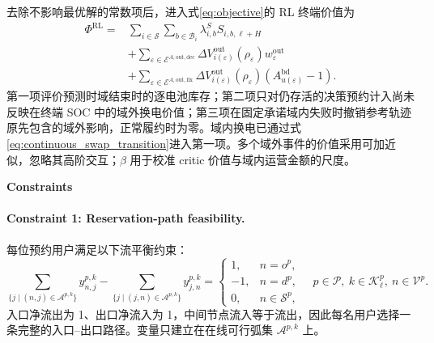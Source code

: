 \documentclass[12pt,a4paper,UTF8]{ctexart}
\begin{document}
去除不影响最优解的常数项后，进入式\eqref{eq:objective}的 RL 终端价值为
\begin{equation}
\begin{aligned}
\Phi^{\mathrm{RL}}
={}&
\sum_{i\in\mathcal S}\sum_{b\in\mathcal B_i}
\lambda^S_{i,b}S_{i,b,\ell+H}\\
&+\sum_{\varepsilon\in\mathcal E^{A,\mathrm{out},\mathrm{dec}}}
\Delta V_{i(\varepsilon)}^{\mathrm{out}}(\rho_\varepsilon)
w_\varepsilon^{\mathrm{out}}\\
&+\sum_{\varepsilon\in\mathcal E^{A,\mathrm{out},\mathrm{fix}}}
\Delta V_{i(\varepsilon)}^{\mathrm{out}}(\rho_\varepsilon)
\left(A_{u(\varepsilon)}^{\mathrm{bd}}-1\right).
\end{aligned}
\label{eq:rl_terminal_value}
\end{equation}
第一项评价预测时域结束时的逐电池库存；第二项只对仍存活的决策预约计入尚未反映在终端 SOC 中的域外换电价值；第三项在固定承诺域内失败时撤销参考轨迹原先包含的域外影响，正常履约时为零。域内换电已通过式\eqref{eq:continuous_swap_transition}进入第一项。多个域外事件的价值采用可加近似，忽略其高阶交互；$\beta$ 用于校准 critic 价值与域内运营金额的尺度。

\textbf{Constraints}

\paragraph{Constraint 1: Reservation-path feasibility.}
每位预约用户满足以下流平衡约束：
\begin{equation}
\sum_{\{j\mid(n,j)\in\mathcal A^{p,k}\}}
y_{n,j}^{p,k}
-
\sum_{\{j\mid(j,n)\in\mathcal A^{p,k}\}}
y_{j,n}^{p,k}
=
\begin{cases}
1,&n=o^p,\\
-1,&n=d^p,\\
0,&n\in\mathcal S^p,
\end{cases}
\quad
p\in\mathcal P,\ k\in\mathcal K_\ell^p,\ n\in\mathcal V^p.
\label{eq:flow}
\end{equation}
入口净流出为 1、出口净流入为 1，中间节点流入等于流出，因此每名用户选择一条完整的入口--出口路径。变量只建立在在线可行弧集
$\mathcal A^{p,k}$ 上。
\end{document}
